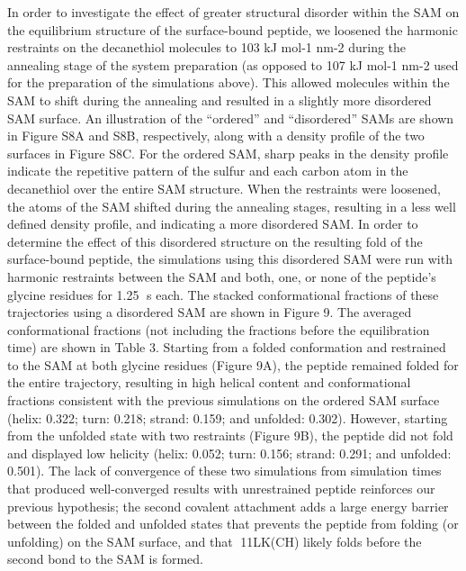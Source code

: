In order to investigate the effect of greater structural disorder within the SAM on the equilibrium structure of the surface-bound peptide, we loosened the harmonic restraints on the decanethiol molecules to 103 kJ mol-1 nm-2 during the annealing stage of the system preparation (as opposed to 107 kJ mol-1 nm-2 used for the preparation of the simulations above). This allowed molecules within the SAM to shift during the annealing and resulted in a slightly more disordered SAM surface. An illustration of the “ordered” and “disordered” SAMs are shown in Figure S8A and S8B, respectively, along with a density profile of the two surfaces in Figure S8C. For the ordered SAM, sharp peaks in the density profile indicate the repetitive pattern of the sulfur and each carbon atom in the decanethiol over the entire SAM structure. When the restraints were loosened, the atoms of the SAM shifted during the annealing stages, resulting in a less well defined density profile, and indicating a more disordered SAM. In order to determine the effect of this disordered structure on the resulting fold of the surface-bound peptide, the simulations using this disordered SAM were run with harmonic restraints between the SAM and both, one, or none of the peptide’s glycine residues for 1.25 s each. The stacked conformational fractions of these trajectories using a disordered SAM are shown in Figure 9. The averaged conformational fractions (not including the fractions before the equilibration time) are shown in Table 3. Starting from a folded conformation and restrained to the SAM at both glycine residues (Figure 9A), the peptide remained folded for the entire trajectory, resulting in high helical content and conformational fractions consistent with the previous simulations on the ordered SAM surface (helix: 0.322; turn: 0.218; strand: 0.159; and unfolded: 0.302). However, starting from the unfolded state with two restraints (Figure 9B), the peptide did not fold and displayed low helicity (helix: 0.052; turn: 0.156; strand: 0.291; and unfolded: 0.501). The lack of convergence of these two simulations from simulation times that produced well-converged results with unrestrained peptide reinforces our previous hypothesis; the second covalent attachment adds a large energy barrier between the folded and unfolded states that prevents the peptide from folding (or unfolding) on the SAM surface, and that 11LK(CH) likely folds before the second bond to the SAM is formed.
